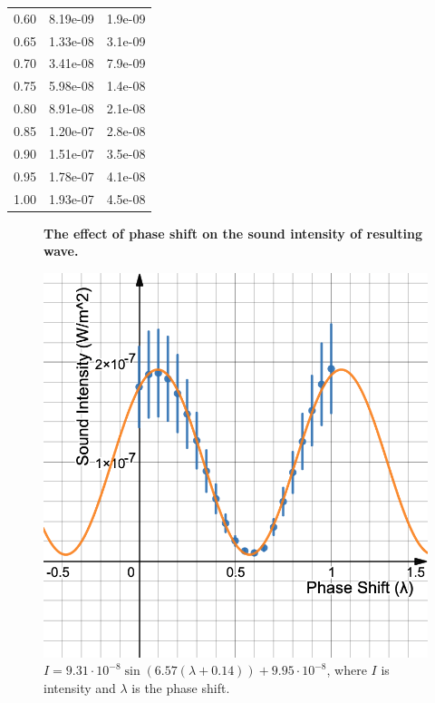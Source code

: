 \documentclass[index]{subfiles}
\begin{document}
\begin{table}[H]
\begin{tabular}{@{}cS[table-format=1.2e-2]S[table-format=1.1e-2]@{}}
        0.60                              & 8.19e-09                              & 1.9e-09                           \\
        0.65                              & 1.33e-08                              & 3.1e-09                           \\
        0.70                              & 3.41e-08                              & 7.9e-09                           \\
        0.75                              & 5.98e-08                              & 1.4e-08                           \\
        0.80                              & 8.91e-08                              & 2.1e-08                           \\
        0.85                              & 1.20e-07                              & 2.8e-08                           \\
        0.90                              & 1.51e-07                              & 3.5e-08                           \\
        0.95                              & 1.78e-07                              & 4.1e-08                           \\
        1.00                              & 1.93e-07                              & 4.5e-08
    \end{tabular}
\end{table}

\begin{figure}[H]
    \centering
    \textbf{The effect of phase shift on the sound intensity of resulting wave.}\medskip\par
    \includegraphics[scale=0.35]{res/graph-calc.png}
    \caption{\(I=9.31\cdot10^{-8}\sin\left(6.57\left(\lambda+0.14\right)\right)+9.95\cdot10^{-8}\), where \(I\) is intensity and \(\lambda\) is the phase shift.}
\end{figure}
\end{document}
